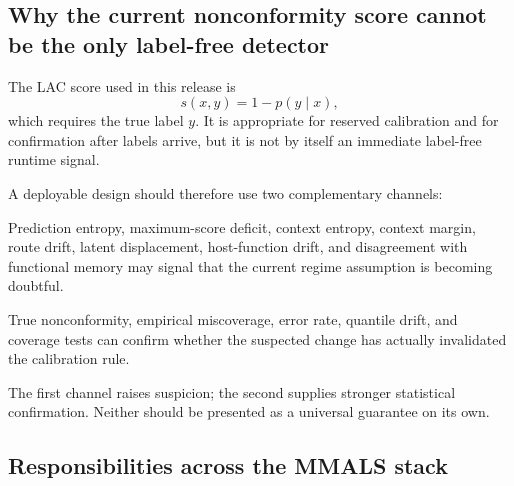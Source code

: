 \subsection{Why the current nonconformity score cannot be the only label-free detector}

The LAC score used in this release is
\begin{equation}
s(x,y)=1-p(y\mid x),
\end{equation}
which requires the true label $y$. It is appropriate for reserved calibration and for confirmation after labels arrive, but it is not by itself an immediate label-free runtime signal.

A deployable design should therefore use two complementary channels:

\begin{description}[leftmargin=1.55in,style=nextline]
\item[Early warning without labels] Prediction entropy, maximum-score deficit, context entropy, context margin, route drift, latent displacement, host-function drift, and disagreement with functional memory may signal that the current regime assumption is becoming doubtful.
\item[Confirmation with delayed labels] True nonconformity, empirical miscoverage, error rate, quantile drift, and coverage tests can confirm whether the suspected change has actually invalidated the calibration rule.
\end{description}

The first channel raises suspicion; the second supplies stronger statistical confirmation. Neither should be presented as a universal guarantee on its own.

\subsection{Responsibilities across the MMALS stack}


